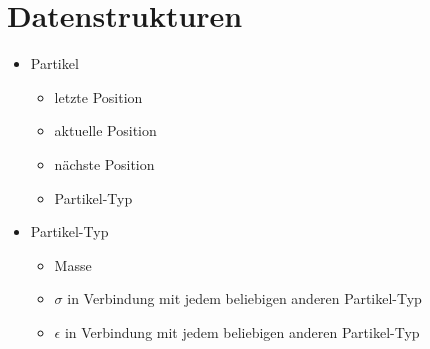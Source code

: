 \documentclass{article}
\begin{document}
\section*{Datenstrukturen}
\begin{itemize}
	\item Partikel\\
	\begin{itemize}
		\item letzte     Position
		\item aktuelle Position
		\item nächste Position
		\item Partikel-Typ
	\end{itemize}
	\item Partikel-Typ\\
	\begin{itemize}
		\item Masse
		\item $\sigma$ in Verbindung mit jedem beliebigen anderen Partikel-Typ
		\item $\epsilon$ in Verbindung mit jedem beliebigen anderen Partikel-Typ
	\end{itemize}
\end{itemize}
\end{document}
